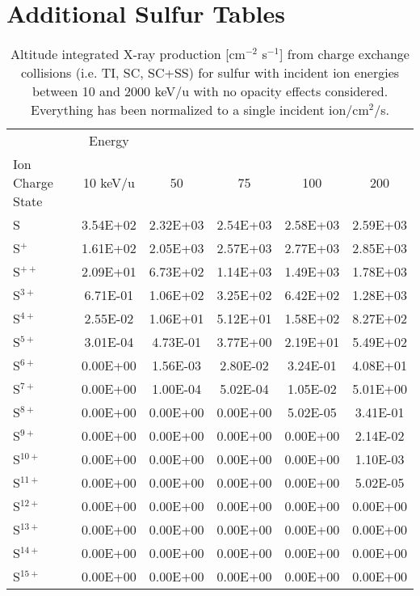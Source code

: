 \section{Additional Sulfur Tables}
\label{app:Sul}

\begin{table}[ht]
    \centering
    \caption{Altitude integrated X-ray production [cm$^{-2}$ s$^{-1}$] from charge exchange collisions (i.e. TI, SC, SC+SS) for sulfur with incident ion energies between 10 and 2000 keV/u with no opacity effects considered. Everything has been normalized to a single incident ion/cm$^2$/s.}
    \begin{tabular}{l|c|c|c|c|c}
    \hline
    & Energy & & & & \\
    Ion Charge State & 10 keV/u & 50 & 75 & 100 & 200 \\
    \hline
    S         & 3.54E+02 & 2.32E+03 & 2.54E+03 & 2.58E+03 & 2.59E+03 \\
    S$^+$     & 1.61E+02 & 2.05E+03 & 2.57E+03 & 2.77E+03 & 2.85E+03 \\
    S$^{ ++}$ & 2.09E+01 & 6.73E+02 & 1.14E+03 & 1.49E+03 & 1.78E+03 \\
    S$^{ 3+}$ & 6.71E-01 & 1.06E+02 & 3.25E+02 & 6.42E+02 & 1.28E+03 \\
    S$^{ 4+}$ & 2.55E-02 & 1.06E+01 & 5.12E+01 & 1.58E+02 & 8.27E+02 \\
    S$^{ 5+}$ & 3.01E-04 & 4.73E-01 & 3.77E+00 & 2.19E+01 & 5.49E+02 \\
    S$^{ 6+}$ & 0.00E+00 & 1.56E-03 & 2.80E-02 & 3.24E-01 & 4.08E+01 \\
    S$^{ 7+}$ & 0.00E+00 & 1.00E-04 & 5.02E-04 & 1.05E-02 & 5.01E+00 \\
    S$^{ 8+}$ & 0.00E+00 & 0.00E+00 & 0.00E+00 & 5.02E-05 & 3.41E-01 \\
    S$^{ 9+}$ & 0.00E+00 & 0.00E+00 & 0.00E+00 & 0.00E+00 & 2.14E-02 \\
    S$^{10+}$ & 0.00E+00 & 0.00E+00 & 0.00E+00 & 0.00E+00 & 1.10E-03 \\
    S$^{11+}$ & 0.00E+00 & 0.00E+00 & 0.00E+00 & 0.00E+00 & 5.02E-05 \\
    S$^{12+}$ & 0.00E+00 & 0.00E+00 & 0.00E+00 & 0.00E+00 & 0.00E+00 \\
    S$^{13+}$ & 0.00E+00 & 0.00E+00 & 0.00E+00 & 0.00E+00 & 0.00E+00 \\
    S$^{14+}$ & 0.00E+00 & 0.00E+00 & 0.00E+00 & 0.00E+00 & 0.00E+00 \\
    S$^{15+}$ & 0.00E+00 & 0.00E+00 & 0.00E+00 & 0.00E+00 & 0.00E+00 \\

\end{tabular}
\end{table}
